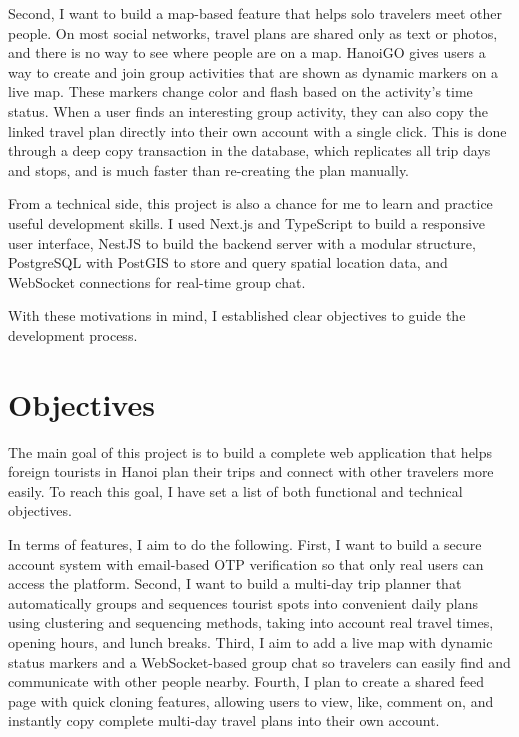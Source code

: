 \documentclass[a4paper,12pt]{report}
\begin{document}
Second, I want to build a map-based feature that helps solo travelers meet other people. On most social networks, travel plans are shared only as text or photos, and there is no way to see where people are on a map. HanoiGO gives users a way to create and join group activities that are shown as dynamic markers on a live map. These markers change color and flash based on the activity's time status. When a user finds an interesting group activity, they can also copy the linked travel plan directly into their own account with a single click. This is done through a deep copy transaction in the database, which replicates all trip days and stops, and is much faster than re-creating the plan manually.

From a technical side, this project is also a chance for me to learn and practice useful development skills. I used Next.js and TypeScript to build a responsive user interface, NestJS to build the backend server with a modular structure, PostgreSQL with PostGIS to store and query spatial location data, and WebSocket connections for real-time group chat.

With these motivations in mind, I established clear objectives to guide the development process.

\section{Objectives}

The main goal of this project is to build a complete web application that helps foreign tourists in Hanoi plan their trips and connect with other travelers more easily. To reach this goal, I have set a list of both functional and technical objectives.

In terms of features, I aim to do the following. First, I want to build a secure account system with email-based OTP verification so that only real users can access the platform. Second, I want to build a multi-day trip planner that automatically groups and sequences tourist spots into convenient daily plans using clustering and sequencing methods, taking into account real travel times, opening hours, and lunch breaks. Third, I aim to add a live map with dynamic status markers and a WebSocket-based group chat so travelers can easily find and communicate with other people nearby. Fourth, I plan to create a shared feed page with quick cloning features, allowing users to view, like, comment on, and instantly copy complete multi-day travel plans into their own account.
\end{document}
